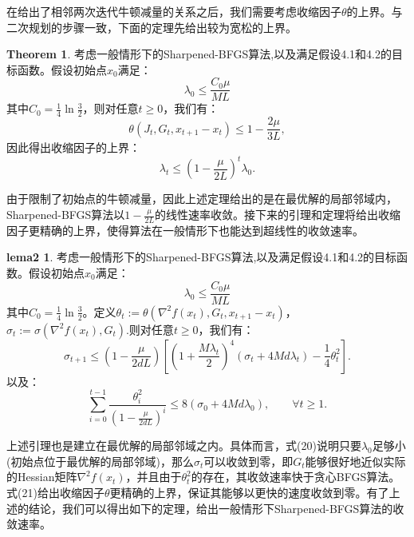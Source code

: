 \documentclass[a4paper,twoside,AutoFakeBold]{article}
\theoremstyle{definition}
\newtheorem{thrm2}{{Theorem}}
\newtheorem{lema2}{{lema2}}
\begin{document}
在给出了相邻两次迭代牛顿减量的关系之后，我们需要考虑收缩因子$\theta$的上界。与二次规划的步骤一致，下面的定理先给出较为宽松的上界。

\begin{thrm2}
    考虑一般情形下的Sharpened-BFGS算法,以及满足假设4.1和4.2的目标函数。假设初始点$x_0$满足：
    \begin{equation}
        \lambda_0\le\frac{C_0\mu}{ML}
    \end{equation}
    其中$C_0 = \frac{1}{4}\ln{\frac{3}{2}}$，则对任意$t\ge 0$，我们有：
    \begin{equation}
        \theta(J_t, G_t, x_{t + 1} - x_{t}) \leq 1 - \frac{2\mu}{3L},
    \end{equation}
    因此得出收缩因子的上界：
    \begin{equation}
        \lambda_t \leq (1 - \frac{\mu}{2L})^{t}\lambda_0.
    \end{equation}
\end{thrm2}

由于限制了初始点的牛顿减量，因此上述定理给出的是在最优解的局部邻域内，Sharpened-BFGS算法以$1-\frac{\mu}{2L}$的线性速率收敛。接下来的引理和定理将给出收缩因子更精确的上界，使得算法在一般情形下也能达到超线性的收敛速率。

\begin{lema2}
    考虑一般情形下的Sharpened-BFGS算法,以及满足假设4.1和4.2的目标函数。假设初始点$x_0$满足：
    \begin{equation}
        \lambda_0\le\frac{C_0\mu}{ML}
    \end{equation}
    其中$C_0 = \frac{1}{4}\ln{\frac{3}{2}}$。定义$\theta_t := \theta(\nabla^2{f(x_{t})}, G_t, x_{t + 1} - x_{t})$，$\sigma_t := \sigma(\nabla^2{f(x_{t})}, G_{t})$.则对任意$t\ge 0$，我们有：
    \begin{equation}
        \sigma_{t+1} \leq (1 - \frac{\mu}{2dL})\left[(1 + \frac{M\lambda_t}{2})^4(\sigma_t + 4Md\lambda_t) - \frac{1}{4}\theta^2_t\right].
    \end{equation}
    以及：
    \begin{equation}
        \sum_{i = 0}^{t - 1}\frac{\theta^2_i}{(1 - \frac{\mu}{2d L})^{i}}  \leq 8(\sigma_0 + 4Md\lambda_0), \qquad \forall t \geq 1. 
    \end{equation}
\end{lema2}

上述引理也是建立在最优解的局部邻域之内。具体而言，式(20)说明只要$\lambda_0$足够小(初始点位于最优解的局部邻域)，那么$\sigma_t$可以收敛到零，即$G_t$能够很好地近似实际的Hessian矩阵$\nabla^2 f(x_t)$，并且由于$\theta_t^2$的存在，其收敛速率快于贪心BFGS算法。
式(21)给出收缩因子$\theta$更精确的上界，保证其能够以更快的速度收敛到零。有了上述的结论，我们可以得出如下的定理，给出一般情形下Sharpened-BFGS算法的收敛速率。
\end{document}
